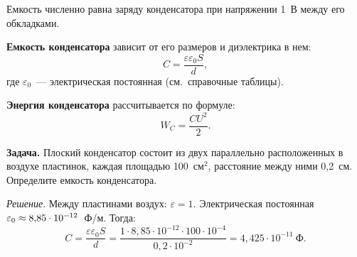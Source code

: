 \documentclass[main.tex]{subfiles}
\begin{document}
Емкость численно равна заряду конденсатора при напряжении 1~В между его обкладками. 

\textbf{Емкость конденсатора} зависит от его размеров и диэлектрика в нем:
\begin{equation}
    C=\frac{\varepsilon\varepsilon_0S}{d},
\end{equation}
где $\varepsilon_0$~--- электрическая постоянная (см.~справочные таблицы).

\textbf{Энергия конденсатора} рассчитывается по формуле:
\begin{equation}
    W_C=\frac{CU^2}{2}.
\end{equation}


\noindent\textbf{Задача.} Плоский конденсатор состоит из двух параллельно расположенных в воздухе пластинок, каждая площадью 100~см$^2$, расстояние между ними 0,2~см. Определите емкость конденсатора.

\smallskip

\noindent\emph{Решение}. Между пластинами воздух: $\varepsilon=1$. Электрическая постоянная $\varepsilon_0\hm\approx8{,}85\cdot10^{-12}$~Ф/м. Тогда:
\begin{equation*}
    C=\frac{\varepsilon\varepsilon_0S}{d}=\frac{1\cdot8{,}85\cdot10^{-12}\cdot100\cdot10^{-4}}{0{,}2\cdot10^{-2}}=4{,}425\cdot10^{-11}~\text{Ф}.
\end{equation*}














 
\end{document}
